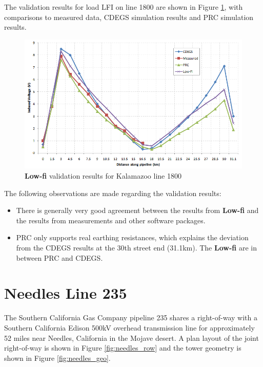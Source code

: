 \documentclass{article}
\begin{document}
The validation results for load LFI on line 1800 are shown in Figure \ref{fig:kalamazoo_comparison}, with comparisons to measured data, CDEGS simulation results and PRC simulation results.

\begin{figure}[!htp]
\begin{center}
\caption{\textbf{Low-fi} validation results for Kalamazoo line 1800}
\label{fig:kalamazoo_comparison}
\includegraphics[width=\linewidth]{./Figures/kalamazoo_comparison.png}
\end{center}
\end{figure}

The following observations are made regarding the validation results:
\begin{itemize}
\item There is generally very good agreement between the results from \textbf{Low-fi} and the results from measurements and other software packages.
\item PRC only supports real earthing resistances, which explains the deviation from the CDEGS results at the 30th street end (31.1km). The \textbf{Low-fi} are in between PRC and CDEGS.
\end{itemize}

\newpage
\section{Needles Line 235}
The Southern California Gas Company pipeline 235 shares a right-of-way with a Southern California Edison 500kV overhead transmission line for approximately 52 miles near Needles, California in the Mojave desert. A plan layout of the joint right-of-way is shown in Figure \ref{fig:needles_row} and the tower geometry is shown in Figure \ref{fig:needles_geo}. 
\end{document}
